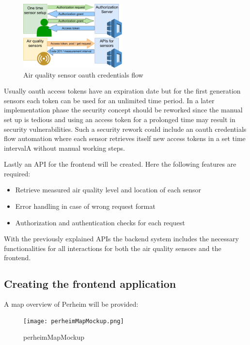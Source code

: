 \documentclass[conference]{IEEEtran}
\begin{document}
\begin{figure}[htbp]
	\centering
	\includegraphics[width=0.48\textwidth]{AirQualityOAuthCredentialsFlow.png}
	\caption{Air quality sensor oauth credentials flow}
	\label{fig:credentialsFlow}
\end{figure}

Usually oauth access tokens have an expiration date but for the first generation sensors each token can be used for an unlimited time period. In a later implementation phase the security concept should be reworked since the manual set up is tedious and using an access token for a prolonged time may result in security vulnerabilities. Such a security rework could include an oauth credentials flow automation where each sensor retrieves itself new access tokens in a set time intervalA without manual working steps.

Lastly an API for the frontend will be created. Here the following features are required:
\begin{itemize}
\item Retrieve measured air quality level and location of each sensor
\item Error handling in case of wrong request format
\item Authorization and authentication checks for each request 
\end{itemize}
With the previously explained APIs the backend system includes the necessary functionalities for all interactions for both the air quality sensors and the frontend.


\subsection{Creating the frontend application}
A map overview of Perheim will be provided:
\begin{figure}[htbp]
	\centering
	\texttt{[image: perheimMapMockup.png]}
	\caption{perheimMapMockup}
	\label{fig:credentialsFlow}
\end{figure}
\end{document}
